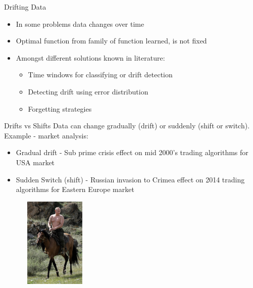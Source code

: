 \documentclass{beamer}
\begin{document}
\begin{frame}{Drifting Data}
\begin{itemize}
\item In some problems data changes over time\newline
\item Optimal function  from family of function learned, is not fixed\newline
\item Amongst different solutions known in literature:\newline
\begin{itemize}
\item Time windows for classifying or drift detection\newline
\item Detecting drift using error distribution\newline
\item Forgetting strategies
\end{itemize}
\end{itemize}
\end{frame}

\begin{frame}{Drifts vs Shifts}
Data can change gradually (drift) or suddenly (shift or switch). \newline\newline
Example - market analysis:
\begin{itemize}
\item Gradual drift -  Sub prime crisis effect on mid 2000's trading algorithms for USA market
\item  Sudden Switch (shift)  - Russian invasion to Crimea effect on 2014  trading algorithms for Eastern Europe market
\end{itemize}
\begin{center}
\includegraphics[height=1.7in,width=2.1in]{putin.jpg}
\end{center}
\end{frame}
\end{document}
